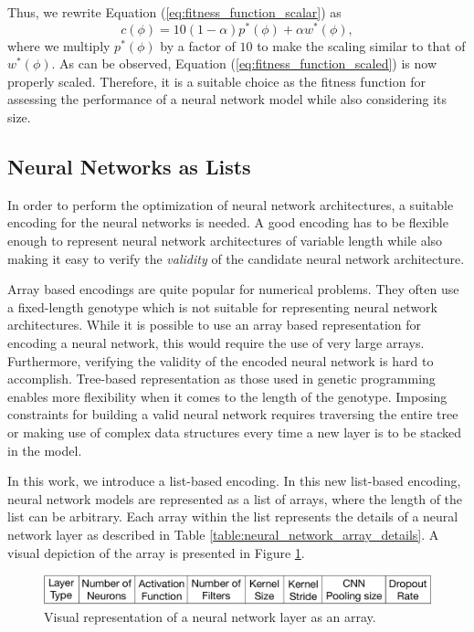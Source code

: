 \documentclass[preprint,12pt]{elsarticle}%
\begin{document}
Thus, we rewrite Equation (\ref{eq:fitness_function_scalar}) as
\begin{equation}
c(\phi) = 10(1-\alpha)p^*(\phi) + \alpha w^*(\phi), 
\label{eq:fitness_function_scaled}
\end{equation}
where we multiply $p^*(\phi)$ by a factor of $10$ to make the scaling similar to that of $w^*(\phi)$. As can be observed, Equation (\ref{eq:fitness_function_scaled}) is now properly scaled. Therefore, it is a suitable choice as the fitness function for assessing the performance of a neural network model while also considering its size.

\subsection{Neural Networks as Lists}
\label{sec:encoding_nn}

In order to perform the optimization of neural network architectures, a suitable encoding for the neural networks is needed. A good encoding has to be flexible enough to represent neural network architectures of variable length while also making it easy to verify the \textit{validity} of the candidate neural network architecture. 

Array based encodings are quite popular for numerical problems. They often use a fixed-length genotype which is not suitable for representing neural network architectures. While it is possible to use an array based representation for encoding a neural network, this would require the use of very large arrays. Furthermore, verifying the validity of the encoded neural network is hard to accomplish. Tree-based representation as those used in genetic programming \cite{Engelbrecht2007} enables more flexibility when it comes to the length of the genotype. Imposing constraints for building a valid neural network requires traversing the entire tree or making use of complex data structures every time a new layer is to be stacked in the model. 

In this work, we introduce a list-based encoding. In this new list-based encoding, neural network models are represented as a list of arrays, where the length of the list can be arbitrary. Each array within the list represents the details of a neural network layer as described in Table \ref{table:neural_network_array_details}. A visual depiction of the array is presented in Figure \ref{fig:neural_network_array}.

\begin{figure}[H]
\centering
\includegraphics[scale=0.4]{Figures/layer_representation.pdf}
\caption{Visual representation of a neural network layer as an array.}
\label{fig:neural_network_array}
\end{figure}
\end{document}
